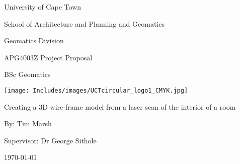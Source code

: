 
\begin{center}
{\Huge University of Cape Town}
\linebreak \linebreak

{\LARGE School of Architecture and Planning and Geomatics}
\linebreak \linebreak

{\Large Geomatics Division}
\linebreak \linebreak


{\Large APG4003Z Project Proposal}
\linebreak

{\Large BSc Geomatics}
\linebreak \linebreak

\begin{center}
\texttt{[image: Includes/images/UCTcircular\_logo1\_CMYK.jpg]}
\linebreak \linebreak
\end{center}

{\Large Creating a 3D wire-frame model from a laser scan of the interior of a room}
\linebreak 

{\Large By: Tim Marsh}
\linebreak 

{\Large Supervisor: Dr George Sithole}
\linebreak 

{\Large \today}

\end{center}
